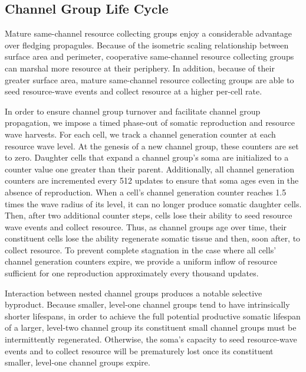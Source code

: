 \subsection{Channel Group Life Cycle}

Mature same-channel resource collecting groups enjoy a considerable advantage over fledging propagules.
Because of the isometric scaling relationship between surface area and perimeter, cooperative same-channel resource collecting groups can marshal more resource at their periphery.
In addition, because of their greater surface area, mature same-channel resource collecting groups are able to seed resource-wave events and collect resource at a higher per-cell rate.

In order to ensure channel group turnover and facilitate channel group propagation, we impose a timed phase-out of somatic reproduction and resource wave harvests.
For each cell, we track a channel generation counter at each resource wave level.
At the genesis of a new channel group, these counters are set to zero.
Daughter cells that expand a channel group's soma are initialized to a counter value one greater than their parent.
Additionally, all channel generation counters are incremented every 512 updates to ensure that soma ages even in the absence of reproduction.
When a cell's channel generation counter reaches 1.5 times the wave radius of its level, it can no longer produce somatic daughter cells.
Then, after two additional counter steps, cells lose their ability to seed resource wave events and collect resource.
Thus, as channel groups age over time, their constituent cells lose the ability regenerate somatic tissue and then, soon after, to collect resource.
To prevent complete stagnation in the case where all cells' channel generation counters expire, we provide a uniform inflow of resource sufficient for one reproduction approximately every thousand updates.

Interaction between nested channel groups produces a notable selective byproduct.
Because smaller, level-one channel groups tend to have intrinsically shorter lifespans, in order to achieve the full potential productive somatic lifespan of a larger, level-two channel group its constituent small channel groups must be intermittently regenerated.
Otherwise, the soma's capacity to seed resource-wave events and to collect resource will be prematurely lost once its constituent smaller, level-one channel groups expire.

